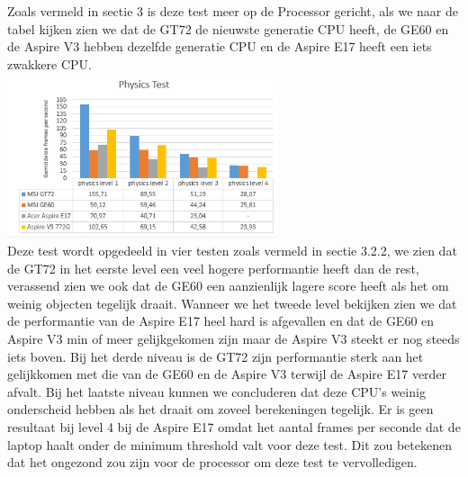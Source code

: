 Zoals vermeld in sectie 3 is deze test meer op de Processor gericht, als we naar de tabel kijken zien we dat de GT72 de nieuwste generatie CPU heeft, de GE60 en de Aspire V3 hebben dezelfde generatie CPU en de Aspire E17 heeft een iets zwakkere CPU.\\
\includegraphics[width=8cm]{physics}\\
Deze test wordt opgedeeld in vier testen zoals vermeld in sectie 3.2.2, we zien dat de GT72 in het eerste level een veel hogere performantie heeft dan de rest, verassend zien we ook dat de GE60 een aanzienlijk lagere score heeft als het om weinig objecten tegelijk draait.
Wanneer we het tweede level bekijken zien we dat de performantie van de Aspire E17 heel hard is afgevallen en dat de GE60 en Aspire V3 min of meer gelijkgekomen zijn maar de Aspire V3 steekt er nog steeds iets boven.
Bij het derde niveau is de GT72 zijn performantie sterk aan het gelijkkomen met die van de GE60 en de Aspire V3 terwijl de Aspire E17 verder afvalt.
Bij het laatste niveau kunnen we concluderen dat deze CPU's weinig onderscheid hebben als het draait om zoveel berekeningen tegelijk. Er is geen resultaat bij level 4 bij de Aspire E17 omdat het aantal frames per seconde dat de laptop haalt onder de minimum threshold valt voor deze test. Dit zou betekenen dat het ongezond zou zijn voor de processor om deze test te vervolledigen.

